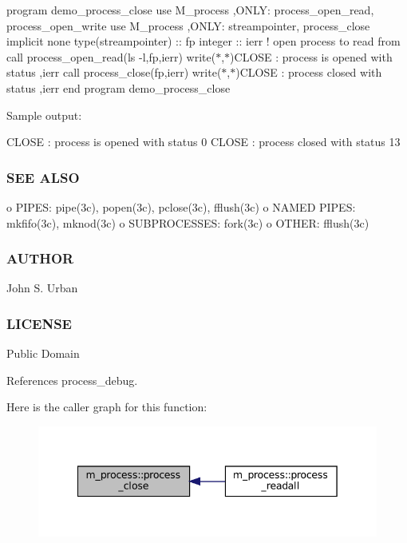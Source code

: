 program demo\+\_\+process\+\_\+close use M\+\_\+process ,O\+N\+LY\+: process\+\_\+open\+\_\+read, process\+\_\+open\+\_\+write use M\+\_\+process ,O\+N\+LY\+: streampointer, process\+\_\+close implicit none type(streampointer) \+:\+: fp integer \+:\+: ierr ! open process to read from call process\+\_\+open\+\_\+read(\textquotesingle{}ls -\/l\textquotesingle{},fp,ierr) write($\ast$,$\ast$)\textquotesingle{}C\+L\+O\+SE \+: process is opened with status \textquotesingle{},ierr call process\+\_\+close(fp,ierr) write($\ast$,$\ast$)\textquotesingle{}C\+L\+O\+SE \+: process closed with status \textquotesingle{},ierr end program demo\+\_\+process\+\_\+close

Sample output\+:

C\+L\+O\+SE \+: process is opened with status 0 C\+L\+O\+SE \+: process closed with status 13

\subsubsection*{S\+EE A\+L\+SO}

o P\+I\+P\+ES\+: pipe(3c), popen(3c), pclose(3c), fflush(3c) o N\+A\+M\+ED P\+I\+P\+ES\+: mkfifo(3c), mknod(3c) o S\+U\+B\+P\+R\+O\+C\+E\+S\+S\+ES\+: fork(3c) o O\+T\+H\+ER\+: fflush(3c) \subsubsection*{A\+U\+T\+H\+OR}

John S. Urban \subsubsection*{L\+I\+C\+E\+N\+SE}

Public Domain 

References process\+\_\+debug.

Here is the caller graph for this function\+:
\nopagebreak
\begin{figure}[H]
\begin{center}
\leavevmode
\includegraphics[width=342pt]{namespacem__process_ab4c5cad3fb46686f0c9b71c3a634f6ae_icgraph}
\end{center}
\end{figure}
\mbox{\label{namespacem__process_a3c0f543a9ceff2671041d73660f60a59}} 
